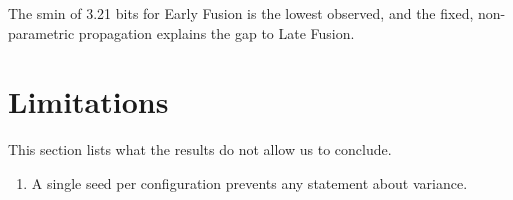 The smin of 3.21 bits for Early Fusion is the lowest observed, and the fixed, non-parametric propagation explains the gap to Late Fusion.

\section{Limitations}\label{sec:res_limitacoes}

This section lists what the results do not allow us to conclude.
\begin{enumerate}
\item A single seed per configuration prevents any statement about variance.
\end{enumerate}
